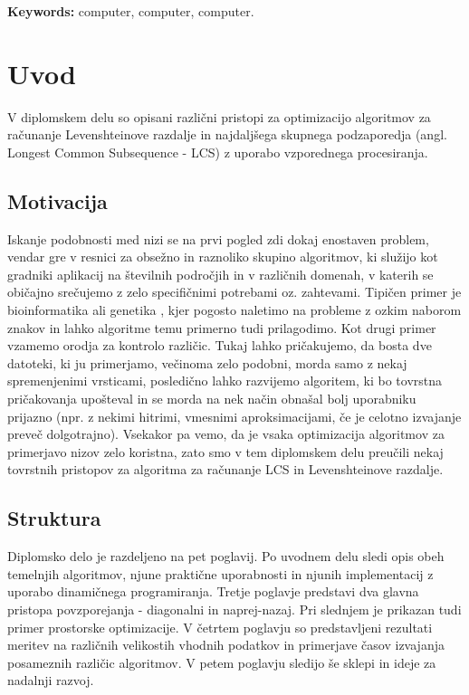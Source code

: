 \documentclass[a4paper,12pt,openright]{book}
\newcommand{\tkeywordsEn}{computer, computer, computer}
\newcommand{\clearemptydoublepage}{\newpage{\pagestyle{empty}\cleardoublepage}}
\begin{document}
\bigskip

\noindent\textbf{Keywords:} \tkeywordsEn.
\clearemptydoublepage

\mainmatter
\setcounter{page}{1}
\pagestyle{fancy}

\chapter{Uvod}

V diplomskem delu so opisani različni pristopi za optimizacijo algoritmov za računanje Levenshteinove razdalje in najdaljšega skupnega podzaporedja (angl. Longest Common Subsequence - LCS) z uporabo vzporednega procesiranja. 

\section{Motivacija}

Iskanje podobnosti med nizi se na prvi pogled zdi dokaj enostaven problem, vendar gre v resnici za obsežno in raznoliko skupino algoritmov, ki služijo kot gradniki aplikacij na številnih področjih in v različnih domenah, v katerih se običajno srečujemo z zelo specifičnimi potrebami oz. zahtevami. Tipičen primer je bioinformatika ali genetika \cite{LCSpracticalUse}, kjer pogosto naletimo na probleme z ozkim naborom znakov in lahko algoritme temu primerno tudi prilagodimo. Kot drugi primer vzamemo orodja za kontrolo različic. Tukaj lahko pričakujemo, da bosta dve datoteki, ki ju primerjamo, večinoma zelo podobni, morda samo z nekaj spremenjenimi vrsticami, posledično lahko razvijemo algoritem, ki bo tovrstna pričakovanja upošteval in se morda na nek način obnašal bolj uporabniku prijazno (npr. z nekimi hitrimi, vmesnimi aproksimacijami, če je celotno izvajanje preveč dolgotrajno). Vsekakor pa vemo, da je vsaka optimizacija algoritmov za primerjavo nizov zelo koristna, zato smo v tem diplomskem delu preučili nekaj tovrstnih pristopov za algoritma za računanje LCS in Levenshteinove razdalje. 

\section{Struktura}

Diplomsko delo je razdeljeno na pet poglavij. Po uvodnem delu sledi opis obeh temelnjih algoritmov, njune praktične uporabnosti in njunih implementacij z uporabo dinamičnega programiranja. Tretje poglavje predstavi dva glavna pristopa povzporejanja - diagonalni in naprej-nazaj. Pri slednjem je prikazan tudi primer prostorske optimizacije. V četrtem poglavju so predstavljeni rezultati meritev na različnih velikostih vhodnih podatkov in primerjave časov izvajanja posameznih različic algoritmov. V petem poglavju sledijo še sklepi in ideje za nadalnji razvoj. 
\end{document}
